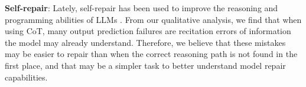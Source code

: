 \textbf{Self-repair}: Lately, self-repair has been used to improve the reasoning and programming abilities of LLMs \citep{chen2023teaching, olausson2023demystifying, madaan2023self, peng2023check, zhang2023self, tyen2023llms}. From our qualitative analysis, we find that when using CoT, many output prediction failures are recitation errors of information the model may already understand. Therefore, we believe that these mistakes may be easier to repair than when the correct reasoning path is not found in the first place, and that \benchmark may be a simpler task to better understand model repair capabilities.